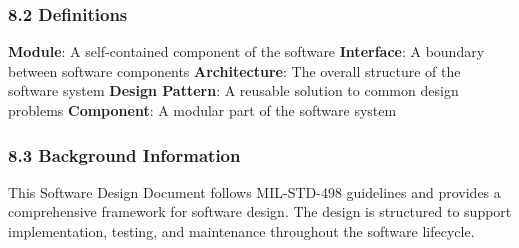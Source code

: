 \subsubsection{8.2 Definitions}
\textbf{Module}: A self-contained component of the software
\textbf{Interface}: A boundary between software components
\textbf{Architecture}: The overall structure of the software system
\textbf{Design Pattern}: A reusable solution to common design problems
\textbf{Component}: A modular part of the software system

\subsubsection{8.3 Background Information}

This Software Design Document follows MIL-STD-498 guidelines and provides a comprehensive framework for software design. The design is structured to support implementation, testing, and maintenance throughout the software lifecycle.


